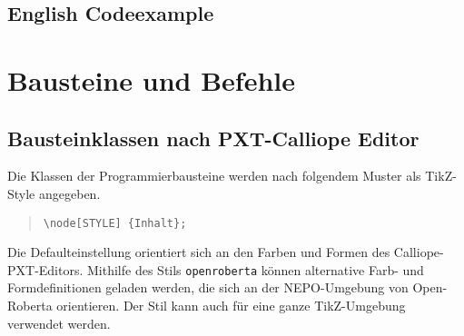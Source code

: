 \documentclass[12pt,a4paper]{ltxdoc}
\begin{document}
\begin{center}
	
\end{center}



\subsection{English Codeexample}

\begin{center}
	
\end{center}
%


\clearpage


\section{Bausteine und Befehle}

\subsection{Bausteinklassen nach PXT-Calliope Editor}

\newcommand{\trynode}[1]{\lstinline|#1|& \tikz\node[#1,codeblocks]{#1}; & \tikz\node[openroberta,#1,codeblocks,eckig,]{#1};\\}
\newcommand{\trynodeOpenRoberta}[1]{\lstinline|#1|& \tikz\node[openroberta,#1,codeblocks,eckig,]{#1};\\}

Die Klassen der Programmierbausteine werden nach folgendem Muster als TikZ-Style angegeben.

\begin{quotation}
	\lstinline|\node[STYLE] {Inhalt};|
\end{quotation}

Die Defaulteinstellung orientiert sich an den Farben und Formen des Calliope-PXT-Editors. Mithilfe des Stils  \lstinline|openroberta| können alternative Farb- und Formdefinitionen geladen werden, die sich an der NEPO-Umgebung von Open-Roberta orientieren. Der Stil kann auch für eine ganze TikZ-Umgebung verwendet werden.
\end{document}
